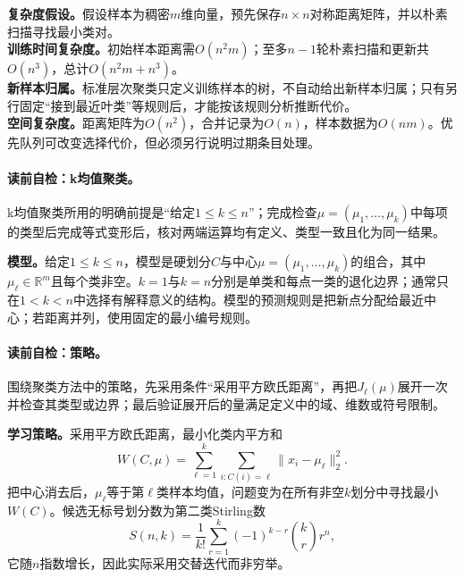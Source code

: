 \begin{complexitybox}
\textbf{复杂度假设。}假设样本为稠密$m$维向量，预先保存$n\times n$对称距离矩阵，并以朴素扫描寻找最小类对。\\
\textbf{训练时间复杂度。}初始样本距离需$O(n^2m)$；至多$n-1$轮朴素扫描和更新共$O(n^3)$，总计$O(n^2m+n^3)$。\\
\textbf{新样本归属。}标准层次聚类只定义训练样本的树，不自动给出新样本归属；只有另行固定“接到最近叶类”等规则后，才能按该规则分析推断代价。\\
\textbf{空间复杂度。}距离矩阵为$O(n^2)$，合并记录为$O(n)$，样本数据为$O(nm)$。优先队列可改变选择代价，但必须另行说明过期条目处理。
\end{complexitybox}

\paragraph{读前自检：k均值聚类。}k均值聚类所用的明确前提是“给定$1\leq k\leq n$”；完成检查$\mu=(\mu_1,\ldots,\mu_k)$中每项的类型后完成等式变形后，核对两端运算均有定义、类型一致且化为同一结果。\par

\label{struct:V4-C02-CH08}
\textbf{模型。}给定$1\leq k\leq n$，\kMeans{}模型是硬划分$C$与中心$\mu=(\mu_1,\ldots,\mu_k)$的组合，其中$\mu_\ell\in\mathbb R^m$且每个类非空。$k=1$与$k=n$分别是单类和每点一类的退化边界；通常只在$1<k<n$中选择有解释意义的结构。模型的预测规则是把新点分配给最近中心；若距离并列，使用固定的最小编号规则。

\paragraph{读前自检：策略。}围绕聚类方法中的策略，先采用条件“采用平方欧氏距离”，再把$J_\ell(\mu)$展开一次并检查其类型或边界；最后验证展开后的量满足定义中的域、维数或符号限制。\par

\label{struct:V4-C02-CH09}
\textbf{学习策略。}采用平方欧氏距离，最小化类内平方和
\[
W(C,\mu)=\sum_{\ell=1}^{k}\sum_{i:C(i)=\ell}\|x_i-\mu_\ell\|_2^2.
\]
把中心消去后，$\mu_\ell$等于第$\ell$类样本均值，问题变为在所有非空$k$划分中寻找最小$W(C)$。候选无标号划分数为第二类Stirling数
\[
S(n,k)=\frac1{k!}\sum_{r=1}^{k}(-1)^{k-r}\binom{k}{r}r^n,
\]
它随$n$指数增长，因此实际采用交替迭代而非穷举。

